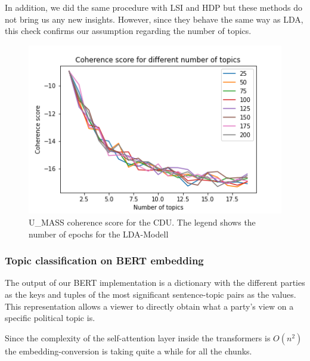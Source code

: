 In addition, we did the same procedure with LSI and HDP but these methods do not bring us any new insights. However, since they behave the same way as LDA, this check confirms our assumption regarding the number of topics. 


\begin{figure}[h]
    \centering
    \includegraphics [width=\linewidth]{resources/coherence_score_u_mass_for_CDU.png}
    \caption{U\_MASS coherence score for the CDU. The legend shows the number of epochs for the LDA-Modell}
    \label{fig:coherence_score}
\end{figure}


\subsubsection{Topic classification on BERT embedding}
The output of our BERT implementation is a dictionary with the different parties as the keys and tuples of the most significant sentence-topic pairs as the values. This representation allows a viewer to directly obtain what a party's view on a specific political topic is.

Since the complexity of the self-attention layer inside the transformers is $O(n^2)$ the embedding-conversion is taking quite a while for all the %
chunks.

